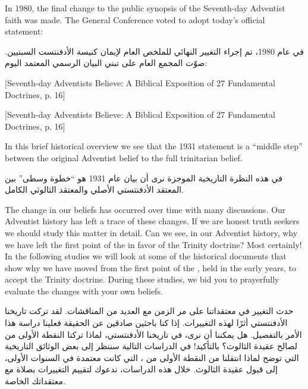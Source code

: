 In 1980, the final change to the public synopsis of the Seventh-day Adventist faith was made. The General Conference voted to adopt today’s official statement:


في عام 1980، تم إجراء التغيير النهائي للملخص العام لإيمان كنيسة الأدفنتست السبتيين. صوّت المجمع العام على تبني البيان الرسمي المعتمد اليوم:


[Seventh-day Adventists Believe: A Biblical Exposition of 27 Fundamental Doctrines, p. 16]


[Seventh-day Adventists Believe: A Biblical Exposition of 27 Fundamental Doctrines, p. 16]


In this brief historical overview we see that the 1931 statement is a “middle step” between the original Adventist belief to the full trinitarian belief.


في هذه النظرة التاريخية الموجزة نرى أن بيان عام 1931 هو “خطوة وسطى” بين المعتقد الأدفنتستي الأصلي والمعتقد الثالوثي الكامل.


The change in our beliefs has occurred over time with many discussions. Our Adventist history has left a trace of these changes. If we are honest truth seekers we should study this matter in detail. Can we see, in our Adventist history, why we have left the first point of the  in favor of the Trinity doctrine? Most certainly! In the following studies we will look at some of the historical documents that show why we have moved from the first point of the , held in the early years, to accept the Trinity doctrine. During these studies, we bid you to prayerfully evaluate the changes with your own beliefs.


حدث التغيير في معتقداتنا على مر الزمن مع العديد من المناقشات. لقد تركت تاريخنا الأدفنتستي أثرًا لهذه التغييرات. إذا كنا باحثين صادقين عن الحقيقة فعلينا دراسة هذا الأمر بالتفصيل. هل يمكننا أن نرى، في تاريخنا الأدفنتستي، لماذا تركنا النقطة الأولى من  لصالح عقيدة الثالوث؟ بالتأكيد! في الدراسات التالية سننظر إلى بعض الوثائق التاريخية التي توضح لماذا انتقلنا من النقطة الأولى من ، التي كانت معتمدة في السنوات الأولى، إلى قبول عقيدة الثالوث. خلال هذه الدراسات، ندعوك لتقييم التغييرات بصلاة مع معتقداتك الخاصة.


